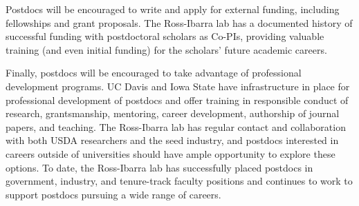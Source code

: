 Postdocs will be encouraged to write and apply for external funding, including fellowships and grant proposals.  The Ross-Ibarra lab has a documented history of successful funding with postdoctoral scholars as Co-PIs, providing valuable training (and even initial funding) for the scholars' future academic careers.

Finally, postdocs will be encouraged to take advantage of professional development programs. UC Davis and Iowa State have infrastructure in place for professional development of postdocs and offer training in responsible conduct of research, grantsmanship, mentoring, career development, authorship of journal papers, and teaching. The Ross-Ibarra lab has regular contact and collaboration with both USDA researchers and the seed industry, and postdocs interested in careers outside of universities should have ample opportunity to explore these options.  To date, the Ross-Ibarra lab has successfully placed postdocs in government, industry, and tenure-track faculty positions and continues to work to support postdocs pursuing a wide range of careers.